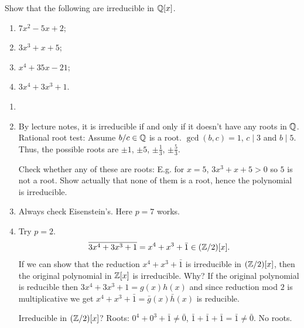 \documentclass[10pt, a4paper]{article}
\begin{document}
\begin{problem}[Question $3$]
    Show that the following are irreducible in $\mathbb{Q}[x]$.
    \begin{enumerate}[label = (\roman*)]
        \item $7x ^ 2 - 5x + 2$;
        
        \item $3x ^ 3 + x + 5$;

        \item $x ^ 4 + 35x - 21$;

        \item $3x ^ 4 + 3x ^ 3 + 1$.
    \end{enumerate}

    \begin{solution}\phantom{}
        \begin{enumerate}[label = (\roman*)]
            \item\phantom{}

            \item By lecture notes,
            it is irreducible if and only if it doesn't have any roots in $\mathbb{Q}$.
            Rational root test:
            Assume $b / c \in \mathbb{Q}$ is a root.
            $\gcd(b, c) = 1$,
            $c \mid 3$ and $b \mid 5$.
            Thus,
            the possible roots are $\pm 1$,
            $\pm 5$,
            $\pm \frac{1}{3}$,
            $\pm\frac{5}{3}$.

            Check whether any of these are roots:
            E.g. for $x = 5$,
            $3x ^ 3 + x + 5 > 0$ so $5$ is not a root.
            Show actually that none of them is a root,
            hence the polynomial is irreducible.

            \item
            Always check Eisenstein's.
            Here $p = 7$ works.

            \item Try $p = 2$.
            \[
            \overline{3x ^ 4 + 3x ^ 3 + 1} = x ^ 4 + x ^ 3 + \bar{1} \in (\mathbb{Z} / 2)[x].
            \]
            If we can show that the reduction $x ^ 4 + x ^ 3 +  \bar{1}$ is irreducible in $(\mathbb{Z} / 2)[x]$,
            then the original polynomial in $\mathbb{Z}[x]$ is irreducible.
            Why?
            If the original polynomial is reducible then $3x ^ 4 + 3x ^ 3 + 1 = g(x)h(x)$ and since reduction mod $2$ is multiplicative we get $x ^ 4 + x ^ 3 + \bar{1} = \bar{g}(x)\bar{h}(x)$ is reducible.

            Irreducible in $(\mathbb{Z} / 2)[x]$?
            Roots:
            $0 ^ 4 + 0 ^ 3 + \bar{1} \neq \bar{0}$,
            $\bar{1} + \bar{1} + \bar{1} = \bar{1} \neq \bar{0}$.
            No roots.


\end{enumerate}
\end{solution}
\end{problem}
\end{document}
